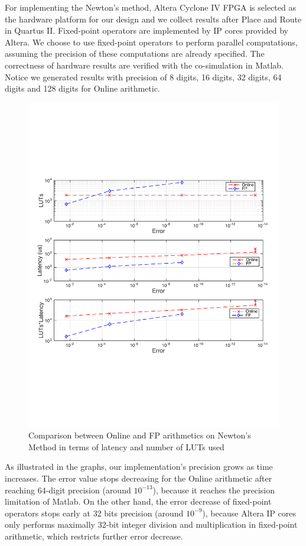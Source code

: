 \documentclass{sig-alternate}
\begin{document}
For implementing the Newton's method, Altera Cyclone IV FPGA is selected as the hardware platform for our design and we collect results after Place and Route in Quartus II.   
Fixed-point operators are implemented by IP cores provided by Altera. We choose to use fixed-point operators to perform parallel computations, assuming the precision of these computations are already specified. The correctness of hardware results are verified with the co-simulation in Matlab. Notice we generated results with precision of 8 digits, 16 digits, 32 digits, 64 digits and 128 digits for Online arithmetic. 
\vspace{-10pt}
\begin{figure} [ht]
	\centering
	\includegraphics[width=\columnwidth]{Figure_101}
	\caption{Comparison between Online and FP arithmetics on Newton's Method in terms of latency and number of LUTs used}
\end{figure}
\vspace{-10pt}

As illustrated in the graphs, our implementation's precision grows as time increases. The error value stops decreasing for the Online arithmetic after reaching 64-digit precision (around $10^{-13}$), because it reaches the precision limitation of Matlab. On the other hand, the error decrease of fixed-point operators stops early at 32 bits precision (around $10^{-9}$), because Altera IP cores only performs maximally 32-bit integer division and multiplication in fixed-point arithmetic\cite{altera}, which restricts further error decrease.    
\end{document}
